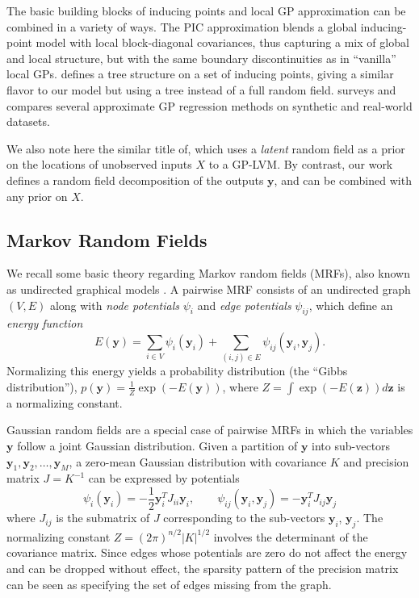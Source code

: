 \documentclass{article}
\renewcommand{\v}[1]{\mathbf{#1}}
\begin{document}
The basic building blocks of inducing points and local GP approximation can be combined
in a variety of ways. The PIC approximation \cite{pic} blends a global
inducing-point model with local block-diagonal covariances, 
thus capturing a mix of global and local
structure, but with the same boundary discontinuities as in
``vanilla'' local GPs. \cite{tsgp} defines a tree structure on a set of
inducing points, giving a similar flavor to our model but using a tree
instead of a full random field. \cite{jmlr-approx-gps} surveys and compares
several approximate GP regression methods on synthetic and real-world
datasets. 

We also note here the similar title of\cite{GPLRF}, which uses a {\em
  latent} random field as a prior on the locations of unobserved inputs
$X$ to a GP-LVM. By contrast, our work defines a random field
decomposition of the outputs $\v{y}$, and can be combined with any
prior on $X$. 

\subsection{Markov Random Fields}

We recall some basic theory regarding Markov random fields
(MRFs), also known as undirected graphical models \cite{koller}. A pairwise
MRF consists of an undirected graph $(V, E)$ along with {\em node potentials} $\psi_i$ and {\em edge
potentials} $\psi_{ij}$, which define an {\em energy function} 
\begin{equation}
E(\v{y}) = \sum_{i\in V} \psi_{i}(\v{y}_i) + \sum_{(i,j)\in E}
\psi_{ij}(\v{y}_i, \v{y}_j).\label{eqn:mrf}
\end{equation}
Normalizing this energy yields a probability distribution (the ``Gibbs
distribution''), $p(\v{y}) = \frac{1}{Z}\exp(-E(\v{y}))$, where $Z = \int \exp(-E(\v{z})) d\v{z}$ is a normalizing constant. 

Gaussian random fields are a special case of pairwise MRFs in which
the variables $\v{y}$ follow a joint Gaussian distribution. Given a partition of
$\v{y}$ into sub-vectors $\v{y}_1, \v{y}_2, \ldots, \v{y}_M$, a
zero-mean Gaussian distribution with covariance $K$ and precision
matrix $J = K^{-1}$ can
be expressed by potentials 
\begin{equation}
\psi_i(\v{y}_i) = -\frac{1}{2}\v{y}_i^T
J_{ii} \v{y}_i, \qquad\psi_{ij}(\v{y}_i, \v{y}_j) = -\v{y}_i^T J_{ij}
\v{y}_j \label{eqn:gaussian-mrf}
\end{equation} where $J_{ij}$ is the submatrix of $J$ corresponding
to the sub-vectors $\v{y}_i$, $\v{y}_j$. The
normalizing constant $Z =
(2\pi)^{n/2}|K|^{1/2}$ involves the determinant of the covariance
matrix. Since edges whose potentials are zero do not affect the energy
and can be dropped without effect, the sparsity pattern of the
precision matrix can be seen as specifying the set of edges missing
from the graph. 
\end{document}
